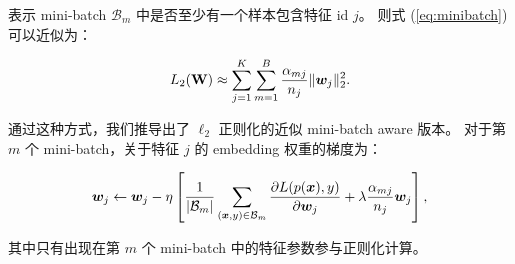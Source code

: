 表示 mini-batch $\mathcal{B}_m$ 中是否至少有一个样本包含特征 id $j$。
则式 (\ref{eq:minibatch}) 可以近似为：
\begin{small}
\begin{equation}
\label{eq:approx}
L_2(\boldsymbol{\mathrm{W}})\approx\sum_{j=1}^{K} \sum_{m=1}^{B}  \frac{\alpha_{mj}}{n_j}\|\boldsymbol{w}_j\|_2^2.
\end{equation}
\end{small}
通过这种方式，我们推导出了 $\ell_2$ 正则化的近似 mini-batch aware 版本。
对于第 $m$ 个 mini-batch，关于特征 $j$ 的 embedding 权重的梯度为：
\begin{small}
\begin{equation}
\boldsymbol{w}_j \leftarrow \boldsymbol{w}_j- \eta
    \left[
       \frac{1}{|\mathcal{B}_m|} \sum_{(\boldsymbol{x},y) \in \mathcal{B}_m} { \frac{\partial L(p(\boldsymbol{x}), y)}{\partial \boldsymbol{w}_j}
       +\lambda \frac{\alpha_{mj}}{n_j}\boldsymbol{w}_j}
    \right],
\end{equation}
\end{small}
其中只有出现在第 $m$ 个 mini-batch 中的特征参数参与正则化计算。






